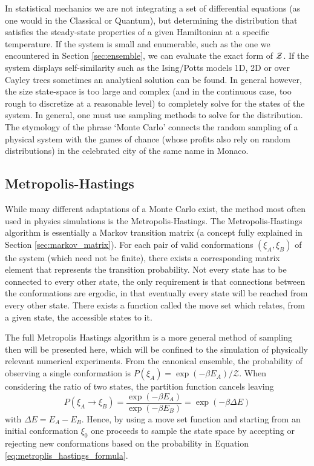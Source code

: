 In statistical mechanics we are not integrating a set of differential equations (as one would in the Classical or Quantum), but determining the distribution that satisfies the steady-state properties of a given Hamiltonian at a specific temperature. If the system is small and enumerable, such as the one we encountered in Section \ref{sec:ensemble}, we can evaluate the exact form of $\mathcal{Z}$. If the system displays self-similarity such as the Ising/Potts models 1D, 2D or over Cayley trees sometimes an analytical solution can be found.\cite{wu_potts_1982} In general however, the size state-space is too large and complex (and in the continuous case, too rough to discretize at a reasonable level) to completely solve for the states of the system. In general, one must use sampling methods to solve for the distribution. The etymology of the phrase `Monte Carlo' connects the random sampling of a physical system with the games of chance (whose profits also rely on random distributions) in the celebrated city of the same name in Monaco. 

\subsection{Metropolis-Hastings}
\label{sec:metroplis_hastings}

While many different adaptations of a Monte Carlo exist, the method most often used in physics simulations is the Metropolis-Hastings.\cite{metropolis_equation_1953} The Metropolis-Hastings algorithm is essentially a Markov transition matrix (a concept fully explained in Section \ref{sec:markov_matrix}). For each pair of valid conformations $(\xi_A, \xi_B)$ of the system (which need not be finite), there exists a corresponding matrix element that represents the transition probability. Not every state has to be connected to every other state, the only requirement is that connections between the conformations are ergodic, in that eventually every state will be reached from every other state. There exists a function called the move set which relates, from a given state, the accessible states to it.

The full Metropolis Hastings algorithm is a more general method of sampling then will be presented here, which will be confined to the simulation of physically relevant numerical experiments. From the canonical ensemble, the probability of observing a single conformation is $P(\xi_A) = \exp(-\beta E_A) / \mathcal{Z}$. When considering the ratio of two states, the partition function cancels leaving
\begin{equation}
  P(\xi_A \rightarrow \xi_B) = \frac{ \exp(-\beta E_A) } { \exp(-\beta E_B) } = \exp(-\beta \Delta E)
  \label{eq:metroplis_hastings_formula}
\end{equation}
with $\Delta E = E_A - E_B$. Hence, by using a move set function and starting from an initial conformation $\xi_0$ one proceeds to sample the state space by accepting or rejecting new conformations based on the probability in Equation \ref{eq:metroplis_hastings_formula}. 

